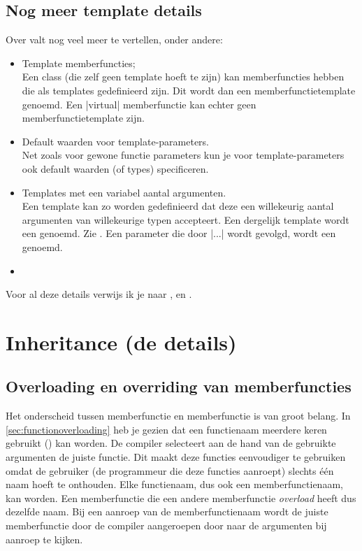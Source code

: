 \begin{cpplstShortInline}
\section{Nog meer template details}
Over  valt nog veel meer te vertellen, onder andere:
\begin{itemize}
	\item Template memberfuncties;\\
	Een class (die zelf geen template hoeft te zijn) kan memberfuncties hebben die als templates gedefinieerd zijn.
	Dit wordt dan een memberfunctietemplate genoemd.
	Een |virtual| memberfunctie kan echter geen memberfunctietemplate zijn.
	\item Default waarden voor template\hyp{}parameters.\\
	Net zoals voor gewone functie parameters kun je voor template\hyp{}parameters ook default waarden (of types) specificeren.
	\item Templates met een variabel aantal argumenten.\\
	Een template kan zo worden gedefinieerd dat deze een willekeurig aantal argumenten van willekeurige typen accepteert. 
	Een dergelijk template wordt een  genoemd.
	Zie .
	Een parameter die door |...| wordt gevolgd, wordt een  genoemd.
	\item 
\end{itemize}
Voor al deze details verwijs ik je naar \cite[hoofdstuk \href{http://www.icce.rug.nl/documents/cplusplus/cplusplus21.html}{21}, \href{http://www.icce.rug.nl/documents/cplusplus/cplusplus22.html}{22} en \href{http://www.icce.rug.nl/documents/cplusplus/cplusplus23.html}{23}]{Brokken2019},  \cite[hoofdstuk 23 t/m 29]{Stroustrup2013} en \cite{Vandevoorde2017}.

\chapter{Inheritance (de details)}
\label{sec:inheritancedetails}
\section{Overloading en overriding van memberfuncties}
\label{override versus overload}
Het onderscheid tussen memberfunctie \emph{} en memberfunctie \emph{} is van groot belang.
In \cref{sec:functionoverloading} heb je gezien dat een functienaam meerdere keren gebruikt () kan worden.
De compiler selecteert aan de hand van de gebruikte argumenten de juiste functie.
Dit maakt deze functies eenvoudiger te gebruiken omdat de gebruiker (de programmeur die deze functies aanroept) slechts één naam hoeft te onthouden.
Elke functienaam, dus ook een memberfunctienaam, kan  worden.
Een memberfunctie die een andere memberfunctie \emph{overload} heeft dus dezelfde naam.
Bij een aanroep van de memberfunctienaam wordt de juiste memberfunctie door de compiler aangeroepen door naar de argumenten bij aanroep te kijken.


\end{cpplstShortInline}
